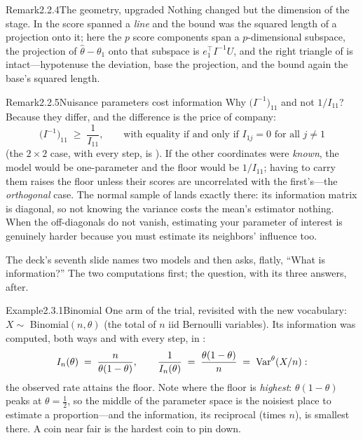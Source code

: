 \documentclass[main.tex]{subfiles}
\begin{document}
\begin{ObjL}{Remark}{2.2.4}{The geometry, upgraded}
Nothing changed but the dimension of the stage. In  the score spanned a
\emph{line} and the bound was the squared length of a projection onto it; here the $p$
score components span a $p$-dimensional subspace, the projection of $\hat\theta-\theta_1$
onto that subspace is $e_1^{\top}I^{-1}U$, and the right triangle of  is
intact---hypotenuse the deviation, base the projection, and the bound again the base's
squared length.
\end{ObjL}

\begin{ObjL}{Remark}{2.2.5}{Nuisance parameters cost information}
Why $\big(I^{-1}\big)_{11}$ and not $1/I_{11}$? Because they differ, and the difference is
the price of company:
\[ \big(I^{-1}\big)_{11} \;\ge\; \frac{1}{I_{11}} ,
   \qquad\text{with equality if and only if } I_{1j}=0 \text{ for all } j\ne 1 \]
(the $2\times2$ case, with every step, is ). If the other coordinates were
\emph{known}, the model would be one-parameter and the floor would be $1/I_{11}$; having to
carry them raises the floor unless their scores are uncorrelated with the first's---the
\emph{orthogonal} case. The normal sample of  lands exactly there: its
information matrix is diagonal, so not knowing the variance costs the mean's estimator
nothing. When the off-diagonals do not vanish, estimating your parameter of interest is
genuinely harder because you must estimate its neighbors' influence too.
\end{ObjL}


The deck's seventh slide names two models and then asks, flatly, ``What is information?''
The two computations first; the question, with its three answers, after.

\begin{ObjL}{Example}{2.3.1}{Binomial}
One arm of the trial, revisited with the new vocabulary: $X\sim$ Binomial$(n,\theta)$ (the
total of $n$ iid Bernoulli variables). Its information was computed, both ways and with
every step, in :
\[ I_n(\theta) \;=\; \frac{n}{\theta(1-\theta)} , \qquad
   \frac{1}{I_n(\theta)} \;=\; \frac{\theta(1-\theta)}{n} \;=\; \operatorname{Var}^{\theta}(X/n) : \]
the observed rate attains the floor. Note where the floor is \emph{highest}:
$\theta(1-\theta)$ peaks at $\theta=\tfrac12$, so the middle of the parameter space is the
noisiest place to estimate a proportion---and the information, its reciprocal (times $n$),
is smallest there. A coin near fair is the hardest coin to pin down.
\end{ObjL}
\end{document}
